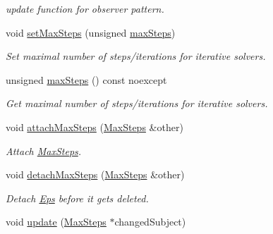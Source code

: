 \begin{DoxyCompactItemize}
\begin{DoxyCompactList}\small\item\em update function for observer pattern. \end{DoxyCompactList}\item 
void \hyperlink{classSpacy_1_1Mixin_1_1MaxSteps_a72f0b7eb50c9a017b5f5e6c2ccf7dfd9_a72f0b7eb50c9a017b5f5e6c2ccf7dfd9}{set\+Max\+Steps} (unsigned \hyperlink{classSpacy_1_1Mixin_1_1MaxSteps_aaeb0b209c78e7b8dd9b268641ce11977_aaeb0b209c78e7b8dd9b268641ce11977}{max\+Steps})
\begin{DoxyCompactList}\small\item\em Set maximal number of steps/iterations for iterative solvers. \end{DoxyCompactList}\item 
unsigned \hyperlink{classSpacy_1_1Mixin_1_1MaxSteps_aaeb0b209c78e7b8dd9b268641ce11977_aaeb0b209c78e7b8dd9b268641ce11977}{max\+Steps} () const noexcept
\begin{DoxyCompactList}\small\item\em Get maximal number of steps/iterations for iterative solvers. \end{DoxyCompactList}\item 
void \hyperlink{classSpacy_1_1Mixin_1_1MaxSteps_a8b093369a1ce5a6323f3dc3c41a738e6_a8b093369a1ce5a6323f3dc3c41a738e6}{attach\+Max\+Steps} (\hyperlink{classSpacy_1_1Mixin_1_1MaxSteps_a8e5d8290884bdc760147862d5b9644dc_a8e5d8290884bdc760147862d5b9644dc}{Max\+Steps} \&other)
\begin{DoxyCompactList}\small\item\em Attach \hyperlink{classSpacy_1_1Mixin_1_1MaxSteps}{Max\+Steps}. \end{DoxyCompactList}\item 
\hypertarget{classSpacy_1_1Mixin_1_1MaxSteps_ac16eca4cd967aed1856f072b08f4aabd}{}void \hyperlink{classSpacy_1_1Mixin_1_1MaxSteps_ac16eca4cd967aed1856f072b08f4aabd}{detach\+Max\+Steps} (\hyperlink{classSpacy_1_1Mixin_1_1MaxSteps_a8e5d8290884bdc760147862d5b9644dc_a8e5d8290884bdc760147862d5b9644dc}{Max\+Steps} \&other)\label{classSpacy_1_1Mixin_1_1MaxSteps_ac16eca4cd967aed1856f072b08f4aabd}

\begin{DoxyCompactList}\small\item\em Detach \hyperlink{classSpacy_1_1Mixin_1_1Eps}{Eps} before it gets deleted. \end{DoxyCompactList}\item 
\hypertarget{classSpacy_1_1Mixin_1_1MaxSteps_a8e0f4d29b15dff17d4503788a9e2e081}{}void \hyperlink{classSpacy_1_1Mixin_1_1MaxSteps_a8e0f4d29b15dff17d4503788a9e2e081}{update} (\hyperlink{classSpacy_1_1Mixin_1_1MaxSteps_a8e5d8290884bdc760147862d5b9644dc_a8e5d8290884bdc760147862d5b9644dc}{Max\+Steps} $\ast$changed\+Subject)\label{classSpacy_1_1Mixin_1_1MaxSteps_a8e0f4d29b15dff17d4503788a9e2e081}


\end{DoxyCompactItemize}
